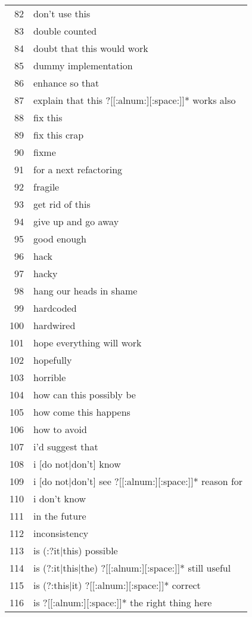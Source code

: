 \begin{longtable}{r|l}
82 & don't use this\\
83 & double counted\\
84 & doubt that this would work\\
85 & dummy implementation\\
86 & enhance so that\\
87 & explain that this ?[[:alnum:][:space:]]* works also\\
88 & fix this\\
89 & fix this crap\\
90 & fixme\\
91 & for a next refactoring\\
92 & fragile\\
93 & get rid of this\\
94 & give up and go away\\
95 & good enough\\
96 & hack\\
97 & hacky\\
98 & hang our heads in shame\\
99 & hardcoded\\
100 & hardwired\\
101 & hope everything will work\\
102 & hopefully\\
103 & horrible\\
104 & how can this possibly be\\
105 & how come this happens\\
106 & how to avoid\\
107 & i'd suggest that\\
108 & i [do not|don't] know\\
109 & i [do not|don't] see ?[[:alnum:][:space:]]* reason for\\
110 & i don't know\\
111 & in the future\\
112 & inconsistency\\
113 & is (:?it|this) possible\\
114 & is (?:it|this|the) ?[[:alnum:][:space:]]* still useful\\
115 & is (?:this|it) ?[[:alnum:][:space:]]* correct\\
116 & is ?[[:alnum:][:space:]]* the right thing here\\

\end{longtable}

